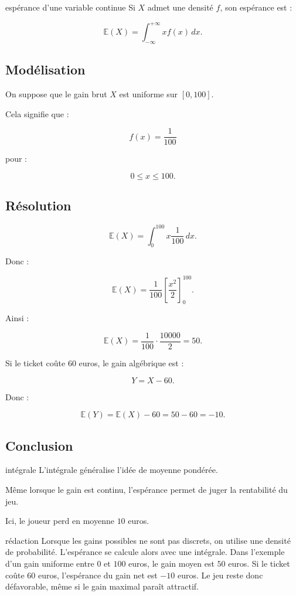 \documentclass[11pt,a4paper]{article}
\newcommand{\E}{\mathbb{E}}
\begin{document}
\begin{definitionbox}{espérance d'une variable continue}
Si $X$ admet une densité $f$, son espérance est :

\[
\E(X)=\int_{-\infty}^{+\infty}x f(x)\,dx.
\]
\end{definitionbox}

\subsection{Modélisation}

On suppose que le gain brut $X$ est uniforme sur $[0,100]$.

Cela signifie que :

\[
f(x)=\frac{1}{100}
\]

pour :

\[
0\leq x\leq 100.
\]

\subsection{Résolution}

\[
\E(X)=\int_0^{100}x\frac{1}{100}\,dx.
\]

Donc :

\[
\E(X)=\frac{1}{100}\left[\frac{x^2}{2}\right]_0^{100}.
\]

Ainsi :

\[
\E(X)=\frac{1}{100}\cdot \frac{10000}{2}=50.
\]

Si le ticket coûte $60$ euros, le gain algébrique est :

\[
Y=X-60.
\]

Donc :

\[
\E(Y)=\E(X)-60=50-60=-10.
\]

\subsection{Conclusion}

\begin{conclusionbox}{intégrale}
L'intégrale généralise l'idée de moyenne pondérée.

Même lorsque le gain est continu, l'espérance permet de juger la rentabilité du jeu.

Ici, le joueur perd en moyenne $10$ euros.
\end{conclusionbox}

\begin{oral}{rédaction}
Lorsque les gains possibles ne sont pas discrets, on utilise une densité de probabilité. L'espérance se calcule alors avec une intégrale. Dans l'exemple d'un gain uniforme entre $0$ et $100$ euros, le gain moyen est $50$ euros. Si le ticket coûte $60$ euros, l'espérance du gain net est $-10$ euros. Le jeu reste donc défavorable, même si le gain maximal paraît attractif.
\end{oral}
\end{document}
